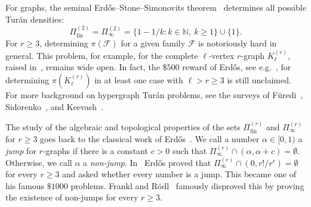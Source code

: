 \documentclass[10pt]{article}
\numberwithin{equation}{section}
\newcommand{\fin}{\mathrm{fin}}
\begin{document}
For graphs, the seminal Erd\H{o}s--Stone--Simonovits theorem~\cite{ErdosStone1946,ErdosSimonovits1966} determines all possible Tur\'an densities:
\[
        \Pi^{(2)}_{\fin} = \Pi^{(2)}_\infty = \{1-1/k \colon k\in\mathbb N,\ k\ge 1\} \cup \{1\}.
\]
For $r\ge3$, determining $\pi(\mathcal F)$ for a given family $\mathcal F$ is notoriously hard in general. This problem, for example,  for the complete  $\ell$-vertex $r$-graph $K_\ell^{(r)}$, raised in~\cite{Turan1941}, remains wide open.
 In fact, the $\$500$ reward of  Erd\H{o}s, see e.g.~\cite{Erd84}, for determining $\pi(K_\ell^{(r)})$ in at least one case with $\ell>r\ge3$ is still unclaimed. For more background on hypergraph Tur\'an problems, see the surveys of F{\"u}redi~\cite{Furedi1991}, Sidorenko~\cite{Sidorenko1995}, and Keevash~\cite{Keevash2011}.

The study of the algebraic and topological properties of the sets $\Pi^{(r)}_{\fin}$ and $\Pi^{(r)}_{\infty}$ for $r\ge 3$ goes back to the classical work of Erd\H{o}s~\cite{Erdos1964}. We call a number $\alpha\in[0,1)$ a \emph{jump} for $r$-graphs if there is a constant $c>0$ such that $\Pi^{(r)}_\infty\cap(\alpha,\alpha+c)=\emptyset$. Otherwise, we call $\alpha$ a \emph{non-jump}. In~\cite{Erdos1964} Erd\H{o}s proved that $\Pi^{(r)}_\infty\cap(0,r!/r^r)=\emptyset$ for every $r\ge3$ and asked whether every number is a jump. This became one of his famous $\$1000$ problems. Frankl and R\"odl~\cite{FranklRodl1984} famously disproved this by proving the existence of non-jumps for every $r\ge3$.
\end{document}
